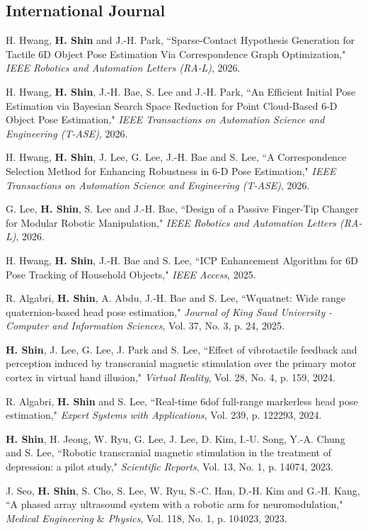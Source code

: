 \documentclass[margin,line]{res}
\begin{document}
\begin{resume}
\section{\sc International Journal}

H. Hwang, \textbf{H. Shin} and J.-H. Park, ``Sparse-Contact Hypothesis Generation for Tactile 6D Object Pose Estimation Via Correspondence Graph Optimization," \textit{IEEE Robotics and Automation Letters (RA-L)}, 2026.

H. Hwang, \textbf{H. Shin}, J.-H. Bae, S. Lee and J.-H. Park, ``An Efficient Initial Pose Estimation via Bayesian Search Space Reduction for Point Cloud-Based 6-D Object Pose Estimation," \textit{IEEE Transactions on Automation Science and Engineering (T-ASE)}, 2026.

H. Hwang, \textbf{H. Shin}, J. Lee, G. Lee, J.-H. Bae and S. Lee, ``A Correspondence Selection Method for Enhancing Robustness in 6-D Pose Estimation," \textit{IEEE Transactions on Automation Science and Engineering (T-ASE)}, 2026.

G. Lee, \textbf{H. Shin}, S. Lee and J.-H. Bae, ``Design of a Passive Finger-Tip Changer for Modular Robotic Manipulation," \textit{IEEE Robotics and Automation Letters (RA-L)}, 2026.

H. Hwang, \textbf{H. Shin}, J.-H. Bae and S. Lee, ``ICP Enhancement Algorithm for 6D Pose Tracking of Household Objects," \textit{IEEE Access}, 2025.

R. Algabri, \textbf{H. Shin}, A. Abdu, J.-H. Bae and S. Lee, ``Wquatnet: Wide range quaternion-based head pose estimation," \textit{Journal of King Saud University - Computer and Information Sciences}, Vol. 37, No. 3, p. 24, 2025.

\textbf{H. Shin}, J. Lee, G. Lee, J. Park and S. Lee, ``Effect of vibrotactile feedback and perception induced by transcranial magnetic stimulation over the primary motor cortex in virtual hand illusion," \textit{Virtual Reality}, Vol. 28, No. 4, p. 159, 2024.

R. Algabri, \textbf{H. Shin} and S. Lee, ``Real-time 6dof full-range markerless head pose estimation," \textit{Expert Systems with Applications}, Vol. 239, p. 122293, 2024.

\textbf{H. Shin}, H. Jeong, W. Ryu, G. Lee, J. Lee, D. Kim, I.-U. Song, Y.-A. Chung and S. Lee, ``Robotic transcranial magnetic stimulation in the treatment of depression: a pilot study," \textit{Scientific Reports}, Vol. 13, No. 1, p. 14074, 2023.

J. Seo, \textbf{H. Shin}, S. Cho, S. Lee, W. Ryu, S.-C. Han, D.-H. Kim and G.-H. Kang, ``A phased array ultrasound system with a robotic arm for neuromodulation," \textit{Medical Engineering $\&$ Physics}, Vol. 118, No. 1, p. 104023, 2023.


\end{resume}
\end{document}
